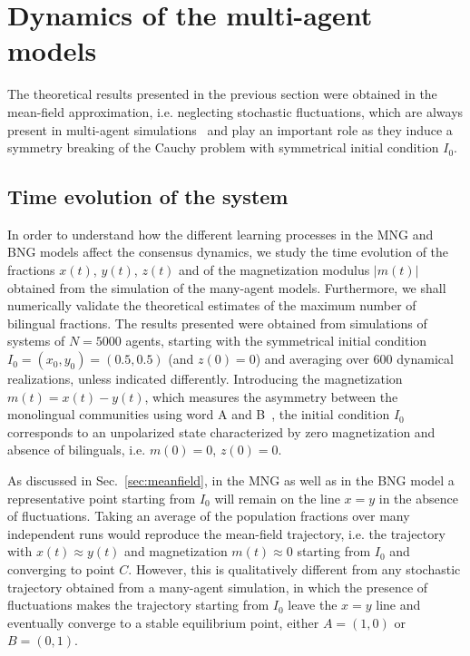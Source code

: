 \documentclass[review]{elsarticle}
\newcommand{\+}{\! + \!}
\begin{document}

\section{Dynamics of the multi-agent models} 
\label{sec:results}


The theoretical results presented in the previous section were obtained in the mean-field approximation, i.e. neglecting stochastic fluctuations, which are always present in multi-agent simulations~\cite{Stauffer-2007a,Vazquez-2010a,Baronchelli-2008a, Castellano-2009a} and play an important role as they induce a symmetry breaking of the Cauchy problem with symmetrical initial condition $I_0$.





\subsection{Time evolution of the system}
\label{evolution}


In order to understand how the different learning processes in the MNG and BNG models affect the consensus dynamics, we study the time evolution of the fractions $x(t)$, $y(t)$, $z(t)$ and of the magnetization modulus $|m(t)|$ obtained from the simulation of the many-agent models.
Furthermore, we shall numerically validate the theoretical estimates of the maximum number of bilingual fractions. 
The results presented were obtained from simulations of systems of $N=5000$ agents, starting with the symmetrical initial condition $I_0=(x_0,y_0)=(0.5,0.5)$ (and $z(0)=0$) and averaging over $600$ dynamical realizations, unless indicated differently.
Introducing the magnetization $m(t) = x(t) - y(t)$, which measures the asymmetry between the monolingual communities using word A and B~\cite{Castello-2009a}, the initial condition $I_0$ corresponds to an unpolarized state characterized by zero magnetization and absence of bilinguals, i.e. $m(0)=0$, $z(0)=0$.






As discussed in Sec.~\ref{sec:meanfield}, in the MNG as well as in the BNG model a representative point starting from $I_0$ will remain on the line $x \!=\! y$ in the absence of fluctuations.
Taking an average of the population fractions over many independent runs would reproduce the mean-field trajectory, i.e. the trajectory with $x(t) \approx y(t)$ and magnetization $m(t) \approx 0$ starting from $I_0$ and converging to point $C$.
However, this is qualitatively different from any stochastic trajectory obtained from a many-agent simulation, in which the presence of fluctuations makes the trajectory starting from $I_0$ leave the $x=y$ line and eventually converge to a stable equilibrium point, either $A=(1,0)$ or $B=(0,1)$.
\end{document}
